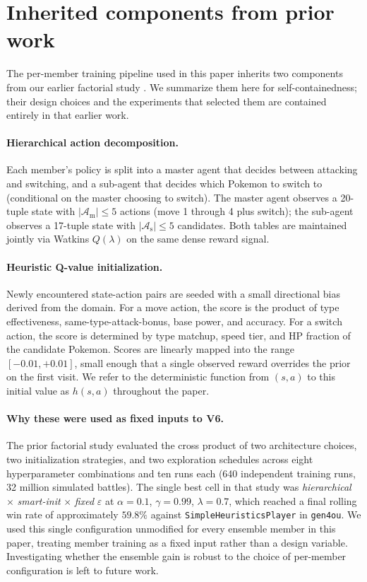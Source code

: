 
\section{Inherited components from prior work}
\label{app:inherited_components}

The per-member training pipeline used in this paper inherits two components
from our earlier factorial study \citep{singh2026v5}. We summarize them
here for self-containedness; their design choices and the experiments
that selected them are contained entirely in that earlier work.

\paragraph{Hierarchical action decomposition.}
Each member's policy is split into a master agent that decides between
attacking and switching, and a sub-agent that decides which Pokemon to
switch to (conditional on the master choosing to switch). The master agent
observes a 20-tuple state with $|\mathcal{A}_{\text{m}}| \leq 5$ actions
(move 1 through 4 plus switch); the sub-agent observes a 17-tuple state
with $|\mathcal{A}_{\text{s}}| \leq 5$ candidates. Both tables are
maintained jointly via Watkins $Q(\lambda)$ on the same dense reward
signal.

\paragraph{Heuristic Q-value initialization.}
Newly encountered state-action pairs are seeded with a small directional
bias derived from the domain. For a move action, the score is the product
of type effectiveness, same-type-attack-bonus, base power, and accuracy.
For a switch action, the score is determined by type matchup, speed tier,
and HP fraction of the candidate Pokemon. Scores are linearly mapped into
the range $[-0.01, +0.01]$, small enough that a single observed reward
overrides the prior on the first visit. We refer to the deterministic
function from $(s, a)$ to this initial value as $h(s, a)$ throughout the
paper.

\paragraph{Why these were used as fixed inputs to V6.}
The prior factorial study evaluated the cross product of two architecture
choices, two initialization strategies, and two exploration schedules
across eight hyperparameter combinations and ten runs each
(640 independent training runs, 32 million simulated battles). The
single best cell in that study was
\textit{hierarchical} $\times$ \textit{smart-init} $\times$ \textit{fixed}
$\varepsilon$ at $\alpha = 0.1$, $\gamma = 0.99$, $\lambda = 0.7$,
which reached a final rolling win rate of approximately
$59.8\%$ against \texttt{SimpleHeuristicsPlayer} in
\texttt{gen4ou}. We used this single configuration unmodified for every
ensemble member in this paper, treating member training as a fixed
input rather than a design variable. Investigating whether the ensemble
gain is robust to the choice of per-member configuration is left to
future work.

